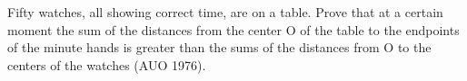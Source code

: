Fifty watches, all showing correct time, are on a table. Prove that at a certain moment the sum of the distances from the center O of the table to the endpoints of the minute hands is greater than the sums of the distances from O to the centers of the watches (AUO 1976).

